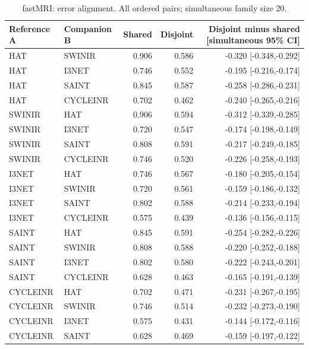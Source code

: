 \begin{table}[t]\centering\small
\caption{fastMRI: error alignment. All ordered pairs; simultaneous family size 20.}
\begin{tabular}{llrrr}\toprule Reference A & Companion B & Shared & Disjoint & Disjoint minus shared [simultaneous 95\% CI]\\\midrule
HAT & SWINIR & 0.906 & 0.586 & -0.320 [-0.348,-0.292] \\
HAT & I3NET & 0.746 & 0.552 & -0.195 [-0.216,-0.174] \\
HAT & SAINT & 0.845 & 0.587 & -0.258 [-0.286,-0.231] \\
HAT & CYCLEINR & 0.702 & 0.462 & -0.240 [-0.265,-0.216] \\
SWINIR & HAT & 0.906 & 0.594 & -0.312 [-0.339,-0.285] \\
SWINIR & I3NET & 0.720 & 0.547 & -0.174 [-0.198,-0.149] \\
SWINIR & SAINT & 0.808 & 0.591 & -0.217 [-0.249,-0.185] \\
SWINIR & CYCLEINR & 0.746 & 0.520 & -0.226 [-0.258,-0.193] \\
I3NET & HAT & 0.746 & 0.567 & -0.180 [-0.205,-0.154] \\
I3NET & SWINIR & 0.720 & 0.561 & -0.159 [-0.186,-0.132] \\
I3NET & SAINT & 0.802 & 0.588 & -0.214 [-0.233,-0.194] \\
I3NET & CYCLEINR & 0.575 & 0.439 & -0.136 [-0.156,-0.115] \\
SAINT & HAT & 0.845 & 0.591 & -0.254 [-0.282,-0.226] \\
SAINT & SWINIR & 0.808 & 0.588 & -0.220 [-0.252,-0.188] \\
SAINT & I3NET & 0.802 & 0.580 & -0.222 [-0.243,-0.201] \\
SAINT & CYCLEINR & 0.628 & 0.463 & -0.165 [-0.191,-0.139] \\
CYCLEINR & HAT & 0.702 & 0.471 & -0.231 [-0.267,-0.195] \\
CYCLEINR & SWINIR & 0.746 & 0.514 & -0.232 [-0.273,-0.190] \\
CYCLEINR & I3NET & 0.575 & 0.431 & -0.144 [-0.172,-0.116] \\
CYCLEINR & SAINT & 0.628 & 0.469 & -0.159 [-0.197,-0.122] \\
\bottomrule\end{tabular}\end{table}
